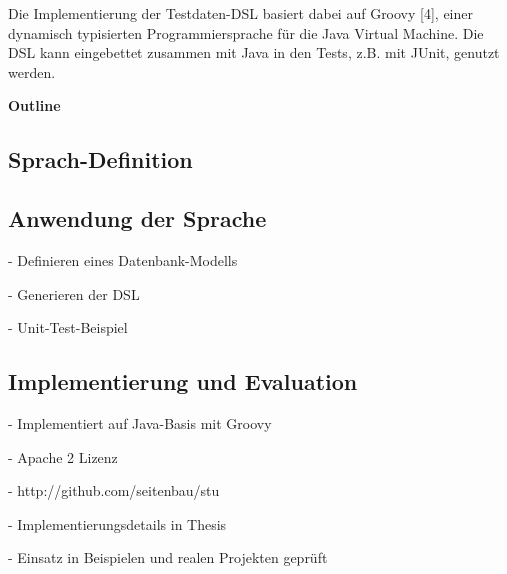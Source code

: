 Die Implementierung der Testdaten-DSL basiert dabei auf Groovy [4], einer dynamisch typisierten Programmiersprache für die Java Virtual Machine. Die DSL kann eingebettet zusammen mit Java in den Tests, z.B. mit JUnit, genutzt werden.


\textbf{Outline}


	\subsection{Sprach-Definition}

	\subsection{Anwendung der Sprache}
	
	- Definieren eines Datenbank-Modells
	
	- Generieren der DSL
	
	- Unit-Test-Beispiel
	

	\subsection{Implementierung und Evaluation}
	
	- Implementiert auf Java-Basis mit Groovy
	
	- Apache 2 Lizenz
	
	- http://github.com/seitenbau/stu
	
	- Implementierungsdetails in Thesis
	
	- Einsatz in Beispielen und realen Projekten geprüft
	
